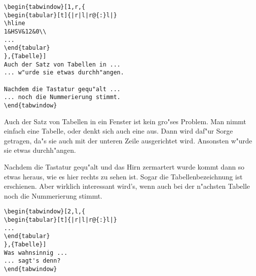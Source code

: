 \documentclass[german,picinpar]{article}
\begin{document}
\begin{verbatim}
\begin{tabwindow}[1,r,{
\begin{tabular}[t]{|r|l|r@{:}l|}
\hline
1&HSV&12&0\\
...
\end{tabular}
},{Tabelle}]
Auch der Satz von Tabellen in ...
... w"urde sie etwas durchh"angen.

Nachdem die Tastatur gequ"alt ...
... noch die Nummerierung stimmt.
\end{tabwindow}
\end{verbatim}

Auch der Satz von Tabellen in ein Fenster ist kein gro"ses Problem.
Man nimmt einfach eine Tabelle, oder denkt sich auch eine aus.
Dann wird daf"ur Sorge getragen, da"s sie auch mit der unteren
Zeile ausgerichtet wird. Ansonsten w"urde sie etwas durchh"angen.

Nachdem die Tastatur gequ"alt und das Hirn zermartert wurde kommt
dann so etwas heraus, wie es hier rechts zu sehen ist. Sogar die
Tabellenbezeichnung ist erschienen. Aber wirklich interessant wird's,
wenn auch bei der n"achsten Tabelle noch die Nummerierung stimmt.
\end{tabwindow}

\begin{verbatim}
\begin{tabwindow}[2,l,{
\begin{tabular}[t]{|r|l|r@{:}l|}
...
\end{tabular}
},{Tabelle}]
Was wahnsinnig ...
... sagt's denn?
\end{tabwindow}
\end{verbatim}
\end{document}

